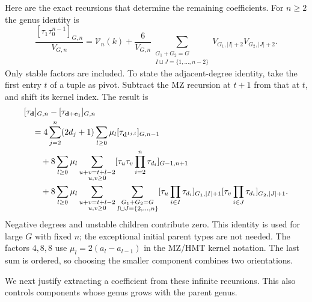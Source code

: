 Here are the exact recursions that determine the remaining coefficients.
For $n\geq2$ the genus identity is
\begin{equation}\label{eq:a:exact-genus}
 \frac{[\tau_1\tau_0^{n-1}]_{G,n}}{V_{G,n}}
 =\mathcal V_n(k)+\frac6{V_{G,n}}
 \sum_{\substack{G_1+G_2=G\\I\sqcup J=\{1,\ldots,n-2\}}}
        V_{G_1,|I|+2}V_{G_2,|J|+2}.
\end{equation}
Only stable factors are included. To state the adjacent-degree identity,
take the first entry $t$ of a tuple as pivot. Subtract the MZ recursion
at $t+1$ from that at $t$, and shift its kernel index. The result is
\begin{align}
 &[\tau_{\mathbf d}]_{G,n}
       -[\tau_{\mathbf d+\mathbf e_1}]_{G,n}\notag\\
 &\quad=4\sum_{j=2}^n(2d_j+1)\sum_{l\geq0}\mu_l
                            [\tau_{\mathbf d^{1j,l}}]_{G,n-1}\notag\\
 &\qquad+8\sum_{l\geq0}\mu_l
       \sum_{\substack{u+v=t+l-2\\u,v\geq0}}
                   [\tau_u\tau_v\prod_{i=2}^n\tau_{d_i}]_{G-1,n+1}\notag\\
 &\qquad+8\sum_{l\geq0}\mu_l
       \sum_{\substack{u+v=t+l-2\\u,v\geq0}}
       \sum_{\substack{G_1+G_2=G\\I\sqcup J=\{2,\ldots,n\}}}
       [\tau_u\prod_{i\in I}\tau_{d_i}]_{G_1,|I|+1}
       [\tau_v\prod_{i\in J}\tau_{d_i}]_{G_2,|J|+1}.
 \label{eq:a:exact-adjacent}
\end{align}
Negative degrees and unstable children contribute zero. This identity
is used for large $G$ with fixed $n$; the exceptional initial parent
types are not needed. The factors $4,8,8$ use
$\mu_l=2(a_l-a_{l-1})$ in the MZ/HMT kernel notation. The last sum is
ordered, so choosing the smaller component combines two orientations.

We next justify extracting a coefficient from these infinite recursions.
This also controls components whose genus grows with the parent genus.

